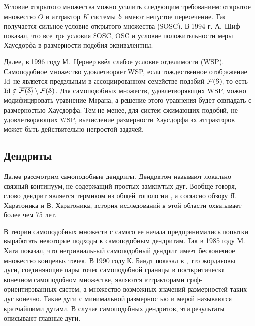 Условие открытого множества можно усилить следующим требованием: открытое множество $O$ и аттрактор $K$ системы ${\EuScript S}$ имеют непустое пересечение. 
Так получается сильное условие открытого множества (SOSC).
В 1994 г. А.~Шиф \cite{Schief1994} показал, что все три условия SOSC, OSC и условие положительности меры Хаусдорфа в размерности подобия эквивалентны.

Далее, в 1996 году М.~Цернер \cite{Zerner1996} ввёл слабое условие отделимости (WSP).
Самоподобное множество удовлетворяет WSP, если тождественное отображение $\mathop{\rm Id} \nolimits$ не является предельным в ассоциированном семействе подобий $\mathcal{F}({\EuScript S})$, то есть $\mathop{\rm Id} \nolimits\notin\overline{\mathcal{F}({\EuScript S})}\setminus\mathcal{F}({\EuScript S})$.
Для самоподобных множеств, удовлетворяющих WSP, можно модифицировать уравнение Морана, а решение этого уравнения будет совпадать с размерностью Хаусдорфа.
Тем не менее, для систем сжимающих подобий, не удовлетворяющих WSP, вычисление размерности Хаусдорфа их аттракторов может быть действительно непростой задачей.


\subsection{Дендриты}

Далее рассмотрим самоподобные дендриты.
Дендритом называют локально связный континуум, не содержащий простых замкнутых дуг.
Вообще говоря, слово дендрит является термином из общей топологии \cite{Kur1, Kur2}, а согласно обзору \cite{Char1998} Я. Харатоника и В. Харатоника, история исследований в этой области охватывает более чем 75 лет.

В теории самоподобных множеств с самого ее начала предпринимались попытки выработать некоторые подходы к самоподобным дендритам.
Так в 1985 году М. Хата \cite{Hata1985} показал, что нетривиальный самоподобный дендрит имеет бесконечное множество концевых точек.
В 1990 году К. Бандт показал в \cite{SSS6}, что жордановы дуги, соединяющие пары точек самоподобной границы в посткритически конечном самоподобном множестве, являются аттракторами граф-ориентированных систем, а множество возможных значений размерностей таких дуг конечно.
Такие дуги с минимальной размерностью и мерой называются кратчайшими дугами.
В случае самоподобных дендритов, эти результаты описывают главные дуги.

